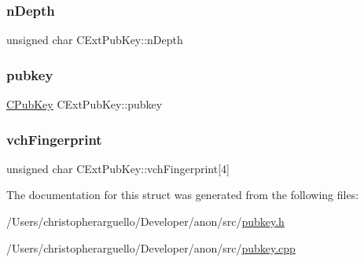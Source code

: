 \mbox{\label{struct_c_ext_pub_key_a58a0724855654eab688cdb00738e3dba}} 
\subsubsection{\texorpdfstring{n\+Depth}{nDepth}}
{\footnotesize\ttfamily unsigned char C\+Ext\+Pub\+Key\+::n\+Depth}

\mbox{\label{struct_c_ext_pub_key_ab18c8520919d20bbfd068565ae566ea8}} 
\subsubsection{\texorpdfstring{pubkey}{pubkey}}
{\footnotesize\ttfamily \mbox{\hyperlink{class_c_pub_key}{C\+Pub\+Key}} C\+Ext\+Pub\+Key\+::pubkey}

\mbox{\label{struct_c_ext_pub_key_a57101a84d16d7897bcec224e488143d9}} 
\subsubsection{\texorpdfstring{vch\+Fingerprint}{vchFingerprint}}
{\footnotesize\ttfamily unsigned char C\+Ext\+Pub\+Key\+::vch\+Fingerprint\mbox{[}4\mbox{]}}



The documentation for this struct was generated from the following files\+:\begin{DoxyCompactItemize}
\item 
/\+Users/christopherarguello/\+Developer/anon/src/\mbox{\hyperlink{pubkey_8h}{pubkey.\+h}}\item 
/\+Users/christopherarguello/\+Developer/anon/src/\mbox{\hyperlink{pubkey_8cpp}{pubkey.\+cpp}}\end{DoxyCompactItemize}
